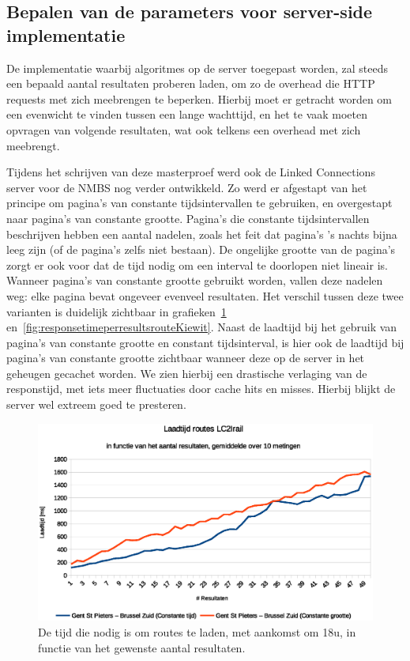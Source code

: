 \subsection{Bepalen van de parameters voor server-side implementatie}

De implementatie waarbij algoritmes op de server toegepast worden, zal steeds een bepaald aantal resultaten proberen laden, om zo de overhead die HTTP requests met zich meebrengen te beperken. Hierbij moet er getracht worden om een evenwicht te vinden tussen een lange wachttijd, en het te vaak moeten opvragen van volgende resultaten, wat ook telkens een overhead met zich meebrengt.

Tijdens het schrijven van deze masterproef werd ook de Linked Connections server voor de NMBS nog verder ontwikkeld. Zo werd er afgestapt van het principe om pagina's van constante tijdsintervallen te gebruiken, en overgestapt naar pagina's van constante grootte. Pagina's die constante tijdsintervallen beschrijven hebben een aantal nadelen, zoals het feit dat pagina's 's nachts bijna leeg zijn (of de pagina's zelfs niet bestaan). De ongelijke grootte van de pagina's zorgt er ook voor dat de tijd nodig om een interval te doorlopen niet lineair is. Wanneer pagina's van constante grootte gebruikt worden, vallen deze nadelen weg: elke pagina bevat ongeveer evenveel resultaten. Het verschil tussen deze twee varianten is duidelijk zichtbaar in grafieken~\ref{fig:responsetimeperresultsrouteBruSouth} en~\ref{fig:responsetimeperresultsrouteKiewit}. Naast de laadtijd bij het gebruik van pagina's van constante grootte en constant tijdsinterval, is hier ook de laadtijd bij pagina's van constante grootte zichtbaar wanneer deze op de server in het geheugen gecachet worden. We zien hierbij een drastische verlaging van de responstijd, met iets meer fluctuaties door cache hits en misses. Hierbij blijkt de server wel extreem goed te presteren.

\begin{figure}[h]
	\centering
	\includegraphics[width=1.00\textwidth]{images/Laadtijd_routes_Gent-St-Pieters_Brussel-Zuid.eps}
	
	\caption[Laadtijd routes tussen Gent en Brussel in functie van aantal resultaten]{De tijd die nodig is om routes te laden, met aankomst om 18u, in functie van het gewenste aantal resultaten.}
	\label{fig:responsetimeperresultsrouteBruSouth}
\end{figure} 

